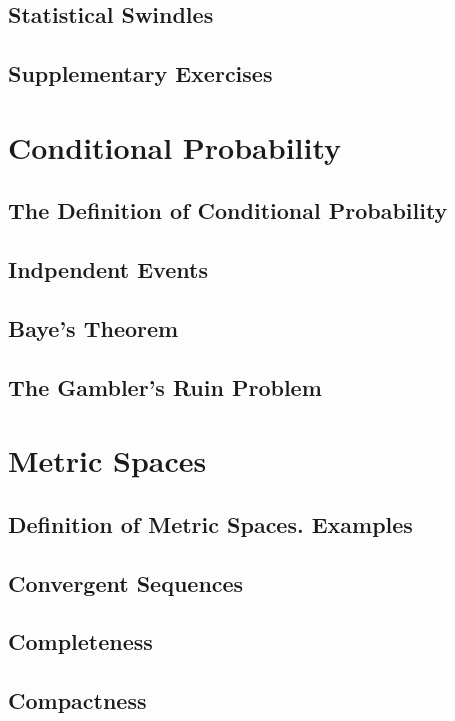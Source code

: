 \documentclass{article}
\begin{document}
		\subsection*{Statistical Swindles}

		\subsection*{Supplementary Exercises}
	
	\section{Conditional Probability}
		\subsection{The Definition of Conditional Probability}
		
		\subsection{Indpendent Events}
		
		\subsection{Baye's Theorem}
		
		\subsection{The Gambler's Ruin Problem}

	
	\section{Metric Spaces}
		\subsection{Definition of Metric Spaces. Examples}

		\subsection{Convergent Sequences}
		
		\subsection{Completeness}
		
		\subsection{Compactness}
		
\end{document}
